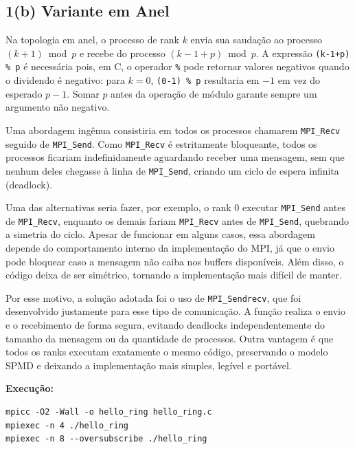 \documentclass[12pt,a4paper]{article}
\begin{document}
\subsection{1(b) Variante em Anel}

Na topologia em anel, o processo de rank $k$ envia sua saudação ao processo $(k+1) \bmod p$ e recebe do processo $(k-1+p) \bmod p$. A expressão \texttt{(k-1+p) \% p} é necessária pois, em C, o operador \texttt{\%} pode retornar valores negativos quando o dividendo é negativo: para $k=0$, \texttt{(0-1) \% p} resultaria em $-1$ em vez do esperado $p-1$. Somar $p$ antes da operação de módulo garante sempre um argumento não negativo.

Uma abordagem ingênua consistiria em todos os processos chamarem \texttt{MPI\_Recv} seguido de \texttt{MPI\_Send}. Como \texttt{MPI\_Recv} é estritamente bloqueante, todos os processos ficariam indefinidamente aguardando receber uma mensagem, sem que nenhum deles chegasse à linha de \texttt{MPI\_Send}, criando um ciclo de espera infinita (deadlock).

Uma das alternativas seria fazer, por exemplo, o rank 0 executar \texttt{MPI\_Send} antes de \texttt{MPI\_Recv}, enquanto os demais fariam \texttt{MPI\_Recv} antes de \texttt{MPI\_Send}, quebrando a simetria do ciclo. Apesar de funcionar em alguns casos, essa abordagem depende do comportamento interno da implementação do MPI, já que o envio pode bloquear caso a mensagem não caiba nos buffers disponíveis. Além disso, o código deixa de ser simétrico, tornando a implementação mais difícil de manter.

Por esse motivo, a solução adotada foi o uso de \texttt{MPI\_Sendrecv}, que foi desenvolvido justamente para esse tipo de comunicação. A função realiza o envio e o recebimento de forma segura, evitando deadlocks independentemente do tamanho da mensagem ou da quantidade de processos. Outra vantagem é que todos os ranks executam exatamente o mesmo código, preservando o modelo SPMD e deixando a implementação mais simples, legível e portável.

\textbf{Execução:}
\begin{lstlisting}[style=shell]
mpicc -O2 -Wall -o hello_ring hello_ring.c
mpiexec -n 4 ./hello_ring
mpiexec -n 8 --oversubscribe ./hello_ring
\end{lstlisting}
\end{document}

